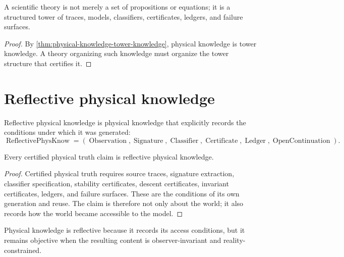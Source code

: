 \begin{corollary}
\label{cor:theory-not-flat}
A scientific theory is not merely a set of propositions or equations; it is a structured tower of traces, models, classifiers, certificates, ledgers, and failure surfaces.
\end{corollary}

\begin{proof}
By \autoref{thm:physical-knowledge-tower-knowledge}, physical knowledge is tower knowledge. A theory organizing such knowledge must organize the tower structure that certifies it.
\end{proof}

\section{Reflective physical knowledge}
\label{sec:reflective-physical-knowledge}

\begin{definition}
\label{def:reflective-physical-knowledge}
Reflective physical knowledge is physical knowledge that explicitly records the conditions under which it was generated:
$$
\operatorname{ReflectivePhysKnow}
=
(\operatorname{Observation},
\operatorname{Signature},
\operatorname{Classifier},
\operatorname{Certificate},
\operatorname{Ledger},
\operatorname{OpenContinuation}).
$$
\end{definition}

\begin{theorem}
\label{thm:physical-knowledge-reflective}
Every certified physical truth claim is reflective physical knowledge.
\end{theorem}

\begin{proof}
Certified physical truth requires source traces, signature extraction, classifier specification, stability certificates, descent certificates, invariant certificates, ledgers, and failure surfaces. These are the conditions of its own generation and reuse. The claim is therefore not only about the world; it also records how the world became accessible to the model.
\end{proof}

\begin{corollary}
\label{cor:reflection-not-subjectivism}
Physical knowledge is reflective because it records its access conditions, but it remains objective when the resulting content is observer-invariant and reality-constrained.
\end{corollary}

